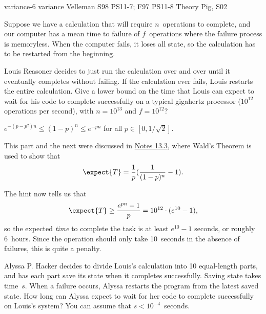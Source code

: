         \problemdata       %
        {variance-6}             %
        {variance}               %
        {Velleman}               %
        {S98 PS11-7; F97 PS11-8} %
        {Theory Pig, S02}        %
\begin{problem}

Suppose we have a calculation that will require $n$~operations to
complete, and our computer has a mean time to failure of
$f$~operations where the failure process is memoryless.  When the
computer fails, it loses all state, so the calculation has to be
restarted from the beginning.

\begin{problemparts}

\problempart Louis Reasoner decides to just run the calculation over and
over until it eventually completes without failing. If the calculation
ever fails, Louis restarts the entire calculation. Give a lower bound
on the time that Louis can expect to wait for his code to complete
successfully on a typical gigahertz processor ($10^{12}$ operations per
second), with $n = 10^{13}$ and 
$f = 10^{12}$? 

\hint $e^{-(p-p^2)n}\leq (1-p)^n \leq e^{-pn}$ for all $p \in [0,1/\sqrt{2}]$.

\begin{solution}
This part and the next were discussed in
\href{http://theory.lcs.mit.edu/classes/6.042/fall01/lectures/l13.pdf}{Notes
13.3}, where Wald's Theorem is used to show that
\begin{equation*}
\expect{T} = \frac{1}{p}(\frac{1}{(1-p)^n} - 1).
\end{equation*}

The hint now tells us that
  \begin{displaymath}
    \expect{T} \geq \frac{e^{pn}-1}{p} = 10^{12} \cdot (e^{10} - 1),
  \end{displaymath}
so the expected \emph{time} to complete the task is at least $e^{10}
- 1$ seconds, or roughly 6~hours. Since the operation should only
take 10~seconds in the absence of failures, this is quite a penalty.
\end{solution}

\problempart Alyssa P. Hacker decides to divide Louis's calculation into
10 equal-length parts, and has each part save its state when it
completes successfully. Saving state takes time~$s$. When a failure
occurs, Alyssa restarts the program from the latest saved state. How
long can Alyssa expect to wait for her code to complete successfully
on Louis's system? You can assume that $s < 10^{-4}$~seconds.


\end{problemparts}
\end{problem}
